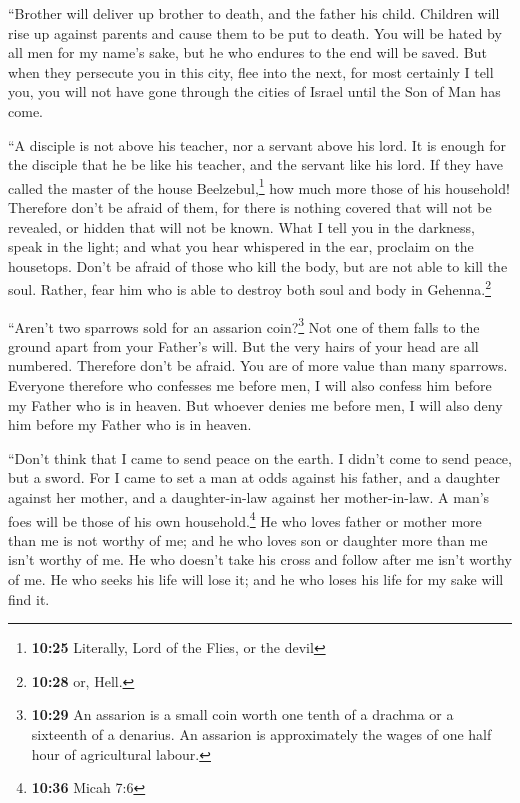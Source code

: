  ``Brother will deliver up brother to death, and the
father his child. Children will rise up against parents and cause them
to be put to death.  You will be hated by all men for my
name's sake, but he who endures to the end will be saved.
 But when they persecute you in this city, flee into the
next, for most certainly I tell you, you will not have gone through the
cities of Israel until the Son of Man has come.

 ``A disciple is not above his teacher, nor a servant
above his lord.  It is enough for the disciple that he be
like his teacher, and the servant like his lord. If they have called the
master of the house Beelzebul,\footnote{\textbf{10:25} Literally, Lord
  of the Flies, or the devil} how much more those of his household!
 Therefore don't be afraid of them, for there is nothing
covered that will not be revealed, or hidden that will not be known.
 What I tell you in the darkness, speak in the light; and
what you hear whispered in the ear, proclaim on the housetops.
 Don't be afraid of those who kill the body, but are not
able to kill the soul. Rather, fear him who is able to destroy both soul
and body in Gehenna.\footnote{\textbf{10:28} or, Hell.}

 ``Aren't two sparrows sold for an assarion
coin?\footnote{\textbf{10:29} An assarion is a small coin worth one
  tenth of a drachma or a sixteenth of a denarius. An assarion is
  approximately the wages of one half hour of agricultural labour.} Not
one of them falls to the ground apart from your Father's will.
 But the very hairs of your head are all numbered.
 Therefore don't be afraid. You are of more value than
many sparrows.  Everyone therefore who confesses me
before men, I will also confess him before my Father who is in heaven.
 But whoever denies me before men, I will also deny him
before my Father who is in heaven.

 ``Don't think that I came to send peace on the earth. I
didn't come to send peace, but a sword.  For I came to
set a man at odds against his father, and a daughter against her mother,
and a daughter-in-law against her mother-in-law.  A man's
foes will be those of his own household.\footnote{\textbf{10:36} Micah
  7:6}  He who loves father or mother more than me is not
worthy of me; and he who loves son or daughter more than me isn't worthy
of me.  He who doesn't take his cross and follow after me
isn't worthy of me.  He who seeks his life will lose it;
and he who loses his life for my sake will find it.


